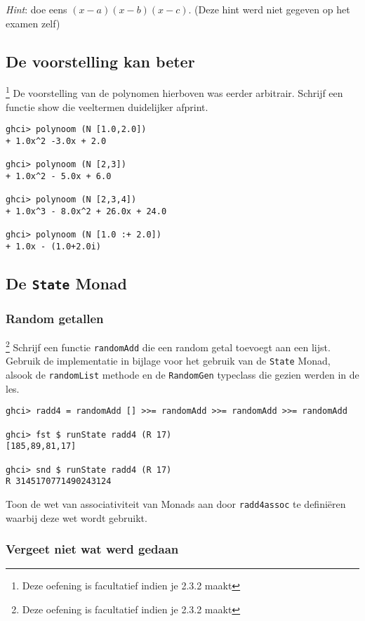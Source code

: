 \documentclass[kulak]{kulakarticle}
\begin{document}
	\textit{Hint}: doe eens \((x - a)(x - b)(x - c)\). (Deze hint werd niet gegeven op het examen zelf)

	\subsection{De voorstelling kan beter}
	\footnote{Deze oefening is facultatief indien je 2.3.2 maakt} De voorstelling van de polynomen hierboven was eerder arbitrair. Schrijf een functie show die veeltermen duidelijker afprint.

	\begin{verbatim}
ghci> polynoom (N [1.0,2.0])
+ 1.0x^2 -3.0x + 2.0

ghci> polynoom (N [2,3])
+ 1.0x^2 - 5.0x + 6.0

ghci> polynoom (N [2,3,4])
+ 1.0x^3 - 8.0x^2 + 26.0x + 24.0

ghci> polynoom (N [1.0 :+ 2.0])
+ 1.0x - (1.0+2.0i)\end{verbatim}

	\subsection{De \texttt{State} Monad}

	\subsubsection{Random getallen}
	\footnote{Deze oefening is facultatief indien je 2.3.2 maakt} Schrijf een functie \texttt{randomAdd} die een random getal toevoegt aan een lijst. Gebruik de implementatie in bijlage voor het gebruik van de \texttt{State} Monad, alsook de \texttt{randomList} methode en de \texttt{RandomGen} typeclass die gezien werden in de les.

\begin{verbatim}
ghci> radd4 = randomAdd [] >>= randomAdd >>= randomAdd >>= randomAdd

ghci> fst $ runState radd4 (R 17)
[185,89,81,17]

ghci> snd $ runState radd4 (R 17)
R 3145170771490243124\end{verbatim}

	Toon de wet van associativiteit van Monads aan door \texttt{radd4assoc} te definiëren waarbij deze wet wordt gebruikt.

	\subsubsection{Vergeet niet wat werd gedaan}
\end{document}
